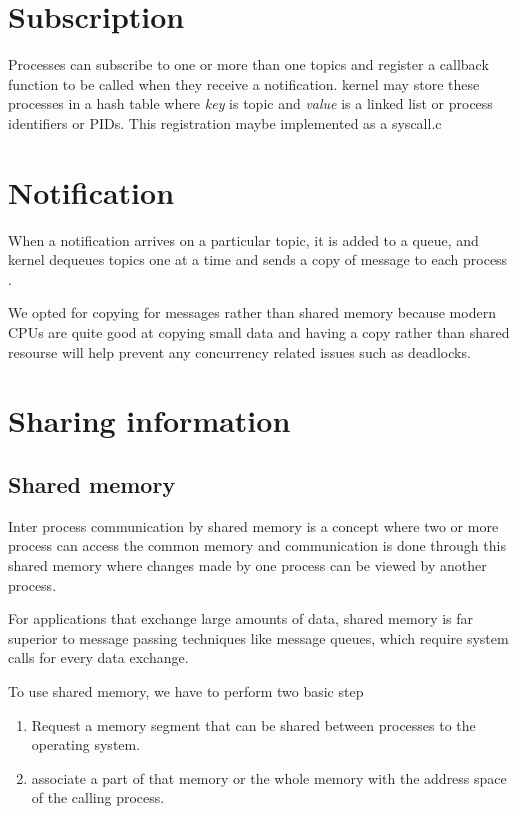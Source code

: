 \documentclass[12pt]{report}
\begin{document}
	\section{Subscription}
	Processes can subscribe to one or more than one topics and register a callback
	function to be called when they receive a notification.
	kernel may store these processes in a hash table where \textit{key} is topic 
	and \textit{value} is a linked list or process identifiers or PIDs.
	This registration maybe implemented as a syscall.c
		
	\section{Notification}
	When a notification arrives on a particular topic, it is added to a queue,
	and kernel dequeues topics one at a time and sends a copy of message to each 
	process \cite{citation04}.
	
	We opted for copying for messages rather than shared memory because
	modern CPUs are quite good at copying small data and having a copy rather than
	shared resourse will help prevent any concurrency related issues such as deadlocks.	

    \section{Sharing information}
    \subsection{Shared memory}
    Inter process communication by shared memory is a concept where two or
    more process can access the common memory and communication is done
    through this shared memory where changes made by one process can be
    viewed by another process.

    For applications that exchange large amounts of data, shared memory is
    far superior to message passing techniques like message queues, which require
    system calls for every data exchange.

    To use shared memory, we have to perform two basic step
    \begin{enumerate}
		\item Request a memory segment that can be shared between processes to the operating system.		
        \item associate a part of that memory or the whole memory with the address space of the calling process.
	\end{enumerate}
    
\end{document}
